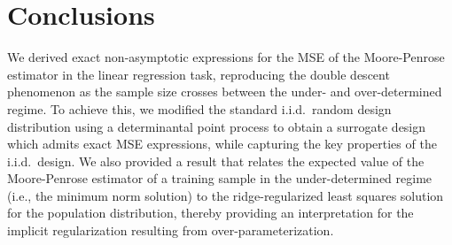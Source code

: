 \documentclass[thesis.tex]{subfiles}
\begin{document}



\section{Conclusions}
\label{s:conclusions}

We derived exact non-asymptotic expressions for the MSE of the
Moore-Penrose estimator in the linear regression task, reproducing
the double descent phenomenon as the sample size crosses between the
under- and over-determined regime. To achieve this, we modified the
standard i.i.d.~random design distribution using a determinantal
point process to obtain a surrogate design which admits exact MSE expressions,
while capturing the key properties of the i.i.d.~design. We
also provided a result that relates the expected value of the
Moore-Penrose estimator of a training sample in the under-determined regime (i.e., the
minimum norm solution) to the ridge-regularized least squares solution
for the population distribution, thereby providing an interpretation for the
implicit regularization resulting from over-parameterization.


\end{document}
